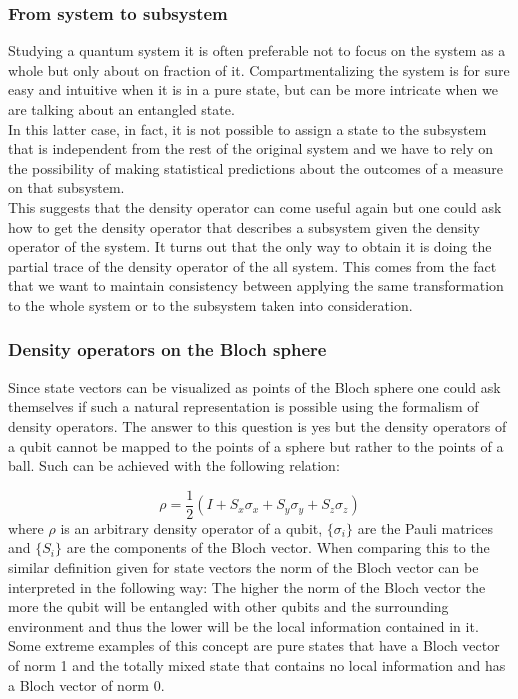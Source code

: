 \documentclass{article}
\begin{document}
\subsubsection{From system to subsystem}

Studying a quantum system it is often preferable not to focus on the
system as a whole but only about on fraction of it.
Compartmentalizing the system is for sure easy and intuitive when it
is in a pure state, but can be more intricate when we are talking about
an entangled state.\\
In this latter case, in fact, it is not possible to assign a state to the
subsystem that is independent from the rest of the original system
and we have to rely on the possibility of making statistical
predictions about the outcomes of a measure on that subsystem.\\
This suggests that the density operator can come useful
again but one could ask how to get the density operator that
describes a subsystem given the density operator of the system.
It turns out that the only way to obtain it is doing the partial
trace of the density operator of the all system.
This comes from the fact that we want to maintain consistency between
applying the same transformation to the whole system or to the
subsystem taken into consideration.

\subsubsection{Density operators on the Bloch sphere}

Since state vectors can be visualized as points of the Bloch sphere
one could ask themselves if such a natural representation is possible
using the formalism of density operators.
The answer to this question is yes but the density operators of a qubit
cannot be mapped to the points of a sphere but rather to the points of
a ball.
Such can be achieved with the following relation:

\begin{equation}
	\rho = \dfrac{1}{2}(I + S_x \sigma_x + S_y \sigma_y + S_z \sigma_z)
\end{equation}
where $\rho$ is an arbitrary density operator of a qubit, $\{\sigma_i\}$ are
the Pauli matrices and $\{S_i\}$ are the components of the Bloch vector.
When comparing this to the similar definition given for state vectors
the norm of the Bloch vector can be interpreted in the following way:
The higher the norm of the Bloch vector the more the qubit will be
entangled with other qubits and the surrounding environment and thus the
lower will be the local information contained in it.
Some extreme examples of this concept are pure states that have a Bloch
vector of norm 1 and the totally mixed state that contains no local
information and has a Bloch vector of norm 0.
\end{document}
